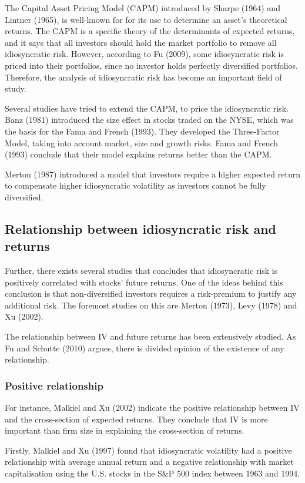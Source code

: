 The Capital Asset Pricing Model (CAPM) introduced by Sharpe (1964) and Lintner (1965), is well-known for for its use to determine an asset's theoretical returns. The CAPM is a specific theory of the determinants of expected returns, and it says that all investors should hold the market portfolio to remove all idiosyncratic risk. However, according to Fu (2009), some idiosyncratic risk is priced into their portfolios, since no investor holds perfectly diversified portfolios. Therefore, the analysis of idiosyncratic risk has become an important field of study.

Several studies have tried to extend the CAPM, to price the idiosyncratic risk. Banz (1981) introduced the size effect in stocks traded on the NYSE, which was the basis for the Fama and French (1993). They developed the Three-Factor Model, taking into account market, size and growth risks. Fama and French (1993) conclude that their model explains returns better than the CAPM.

Merton (1987) introduced a model that investors require a higher expected return to compensate higher idiosyncratic volatility as investors cannot be fully diversified.

\subsection*{Relationship between idiosyncratic risk and returns}
Further, there exists several studies that concludes that idiosyncratic risk is positively correlated with stocks' future returns. One of the ideas behind this conclusion is that non-diversified investors requires a risk-premium to justify any additional risk. The foremost studies on this are Merton (1973), Levy (1978) and Xu (2002).

The relationship between IV and future returns has been extensively studied. As Fu and Schutte (2010) argues, there is divided opinion of the existence of any relationship. 

\subsubsection{Positive relationship}
For instance, Malkiel and Xu (2002) indicate the positive relationship between IV and the cross-section of expected returns. They conclude that IV is more important than firm size in explaining the cross-section of returns.

Firstly, Malkiel and Xu (1997) found that idiosyncratic volatility had a positive relationship with average annual return and a negative relationship with market capitalisation using the U.S. stocks in the S&P 500 index between 1963 and 1994.
 
